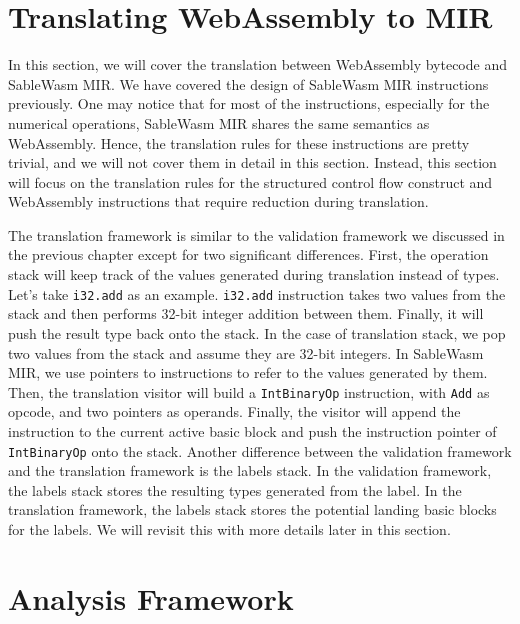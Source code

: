 \section{Translating WebAssembly to MIR}

In this section, we will cover the translation between WebAssembly bytecode and SableWasm MIR. We have covered the design of SableWasm MIR instructions previously. One may notice that for most of the instructions, especially for the numerical operations, SableWasm MIR shares the same semantics as WebAssembly. Hence, the translation rules for these instructions are pretty trivial, and we will not cover them in detail in this section. Instead, this section will focus on the translation rules for the structured control flow construct and WebAssembly instructions that require reduction during translation.

The translation framework is similar to the validation framework we discussed in the previous chapter except for two significant differences. First, the operation stack will keep track of the values generated during translation instead of types. Let's take \texttt{i32.add} as an example. \texttt{i32.add} instruction takes two values from the stack and then performs 32-bit integer addition between them. Finally, it will push the result type back onto the stack. In the case of translation stack, we pop two values from the stack and assume they are 32-bit integers. In SableWasm MIR, we use pointers to instructions to refer to the values generated by them. Then, the translation visitor will build a \texttt{IntBinaryOp} instruction, with \texttt{Add} as opcode, and two pointers as operands. Finally, the visitor will append the instruction to the current active basic block and push the instruction pointer of \texttt{IntBinaryOp} onto the stack. Another difference between the validation framework and the translation framework is the labels stack. In the validation framework, the labels stack stores the resulting types generated from the label. In the translation framework, the labels stack stores the potential landing basic blocks for the labels. We will revisit this with more details later in this section.




\section{Analysis Framework}

